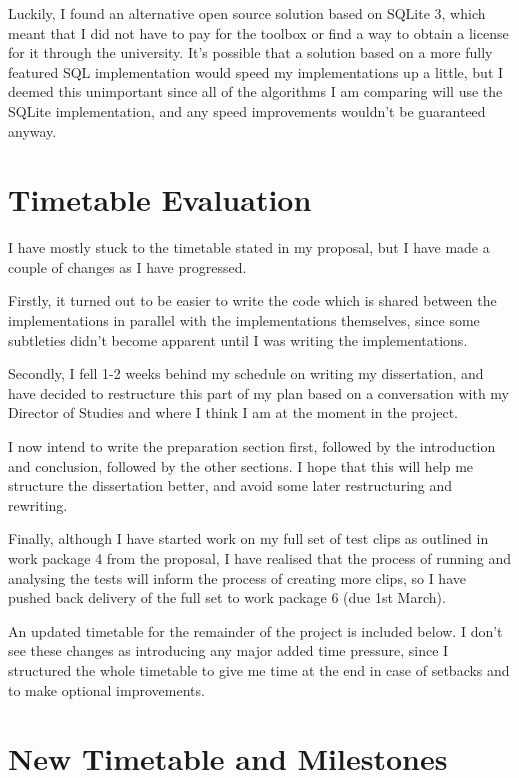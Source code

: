 \documentclass[12pt]{article}
\begin{document}
Luckily, I found an alternative open source solution based on SQLite 3, which meant that I did not have to pay for the toolbox or find a way to obtain a license for it through the university. It's possible that a solution based on a more fully featured SQL implementation would speed my implementations up a little, but I deemed this unimportant since all of the algorithms I am comparing will use the SQLite implementation, and any speed improvements wouldn't be guaranteed anyway.

\section*{Timetable Evaluation}

I have mostly stuck to the timetable stated in my proposal, but I have made a couple of changes as I have progressed.

Firstly, it turned out to be easier to write the code which is shared between the implementations in parallel with the implementations themselves, since some subtleties didn't become apparent until I was writing the implementations. 

Secondly, I fell 1-2 weeks behind my schedule on writing my dissertation, and have decided to restructure this part of my plan based on a conversation with my Director of Studies and where I think I am at the moment in the project.

I now intend to write the preparation section first, followed by the introduction and conclusion, followed by the other sections. I hope that this will help me structure the dissertation better, and avoid some later restructuring and rewriting. 

Finally, although I have started work on my full set of test clips as outlined in work package 4 from the proposal, I have realised that the process of running and analysing the tests will inform the process of creating more clips, so I have pushed back delivery of the full set to work package 6 (due 1st March).

An updated timetable for the remainder of the project is included below. I don't see these changes as introducing any major added time pressure, since I structured the whole timetable to give me time at the end in case of setbacks and to make optional improvements.


\section*{New Timetable and Milestones}
\end{document}
